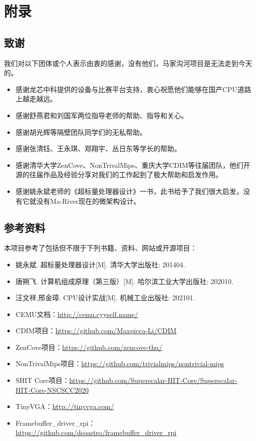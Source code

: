 \chapter*{附录}
\appendix
\renewcommand{\appendixname}{Appendix~\Alph{section}}
\section*{致谢}

\quad 我们对以下团体或个人表示由衷的感谢，没有他们，马家沟河项目是无法走到今天的。

\begin{itemize}
    \item 感谢龙芯中科提供的设备与比赛平台支持，衷心祝愿他们能够在国产CPU道路上越走越远。
    \item 感谢舒燕君和刘国军两位指导老师的帮助、指导和关心。
    \item 感谢胡光辉等隔壁团队同学们的无私帮助。
    \item 感谢张清钰、王永琪、郑翔宇、丛日东等学长的帮助。
    \item 感谢清华大学ZenCove、NonTrivalMips、重庆大学CDIM等往届团队，他们开源的往届作品及经验分享对我们的工作起到了极大帮助和启发作用。
    \item 感谢姚永斌老师的《超标量处理器设计》一书，此书给予了我们很大启发，没有它就没有Ma-River现在的微架构设计。
\end{itemize}

\section*{参考资料}

\quad 本项目参考了包括但不限于下列书籍、资料、网站或开源项目：

\begin{itemize}
    \item 姚永斌. 超标量处理器设计[M]. 清华大学出版社: 201404.
    \item 唐朔飞. 计算机组成原理（第三版）[M]. 哈尔滨工业大学出版社: 202010.
    \item 汪文祥,邢金璋. CPU设计实战[M]. 机械工业出版社: 202101.
    \item CEMU文档：\url{http://cemu.cyyself.name/}
    \item CDIM项目：\url{https://github.com/Maxpicca-Li/CDIM}
    \item ZenCove项目：\url{https://github.com/zencove-thu/}
    \item NonTrivalMips项目：\url{https://github.com/trivialmips/nontrivial-mips}
    \item SHIT Core项目：\url{https://github.com/Superscalar-HIT-Core/Superscalar-HIT-Core-NSCSCC2020}
    \item TinyVGA：\url{http://tinyvga.com/}
    \item Framebuffer\_driver\_rpi：\url{https://github.com/dsoastro/framebuffer_driver_rpi}
\end{itemize}